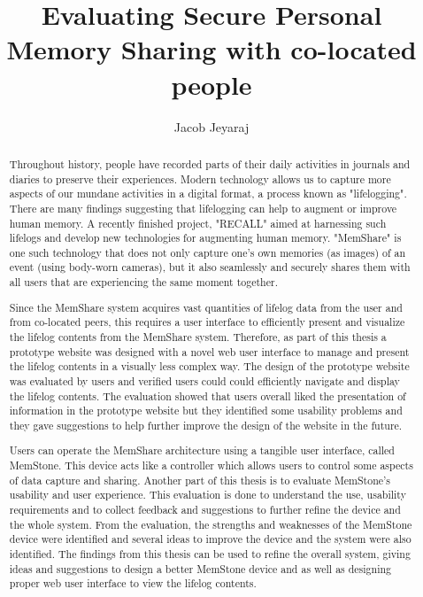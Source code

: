 \documentclass[mscthesis]{usiinfthesis}
\title{Evaluating Secure Personal Memory Sharing with co-located people} %
\author{Jacob Jeyaraj} %
\begin{document}
\maketitle %

\frontmatter %

\begin{abstract}
Throughout history, people have recorded parts of their daily activities in journals and diaries to preserve their experiences. Modern technology allows us to capture more aspects of our mundane activities in a digital format, a process known as "lifelogging". There are many findings suggesting that lifelogging can help to augment or improve human memory. A recently finished project, "RECALL" aimed at harnessing such lifelogs and develop new technologies for augmenting human memory. "MemShare" is one such technology that does not only capture one's own memories (as images) of an event (using body-worn cameras), but it also seamlessly and securely shares them with all users that are experiencing the same moment together.

Since the MemShare system acquires vast quantities of lifelog data from the user and from co-located peers, this requires a user interface to efficiently present and visualize the lifelog contents from the MemShare system. Therefore, as part of this thesis a prototype website was designed with a novel web user interface to manage and present the lifelog contents in a visually less complex way. The design of the prototype website was evaluated by users and verified users could could efficiently navigate and display the lifelog contents. The evaluation showed that users overall liked the presentation of information in the prototype website but they identified some usability problems and they gave suggestions to help further improve the design of the website in the future. 

Users can operate the MemShare architecture using a tangible user interface, called MemStone. This device acts like a controller which allows users to control some aspects of data capture and sharing. Another part of this thesis is to evaluate MemStone's usability and user experience. This evaluation is done to understand the use, usability requirements and to collect feedback and suggestions to further refine the device and the whole system. From the evaluation, the strengths and weaknesses of the MemStone device were identified and several ideas to improve the device and the system were also identified. The findings from this thesis can be used to refine the overall system, giving ideas and suggestions to design a better MemStone device and as well as designing proper web user interface to view the lifelog contents.

\end{abstract}
\end{document}
